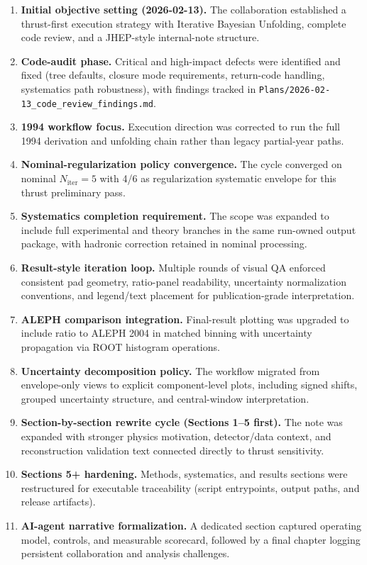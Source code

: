 \begin{enumerate}
\item \textbf{Initial objective setting (2026-02-13).} The collaboration established a thrust-first execution strategy with Iterative Bayesian Unfolding, complete code review, and a JHEP-style internal-note structure.
\item \textbf{Code-audit phase.} Critical and high-impact defects were identified and fixed (tree defaults, closure mode requirements, return-code handling, systematics path robustness), with findings tracked in \texttt{Plans/2026-02-13\_code\_review\_findings.md}.
\item \textbf{1994 workflow focus.} Execution direction was corrected to run the full 1994 derivation and unfolding chain rather than legacy partial-year paths.
\item \textbf{Nominal-regularization policy convergence.} The cycle converged on nominal $N_{\mathrm{iter}}=5$ with 4/6 as regularization systematic envelope for this thrust preliminary pass.
\item \textbf{Systematics completion requirement.} The scope was expanded to include full experimental and theory branches in the same run-owned output package, with hadronic correction retained in nominal processing.
\item \textbf{Result-style iteration loop.} Multiple rounds of visual QA enforced consistent pad geometry, ratio-panel readability, uncertainty normalization conventions, and legend/text placement for publication-grade interpretation.
\item \textbf{ALEPH comparison integration.} Final-result plotting was upgraded to include ratio to ALEPH 2004 in matched binning with uncertainty propagation via ROOT histogram operations.
\item \textbf{Uncertainty decomposition policy.} The workflow migrated from envelope-only views to explicit component-level plots, including signed shifts, grouped uncertainty structure, and central-window interpretation.
\item \textbf{Section-by-section rewrite cycle (Sections 1--5 first).} The note was expanded with stronger physics motivation, detector/data context, and reconstruction validation text connected directly to thrust sensitivity.
\item \textbf{Sections 5+ hardening.} Methods, systematics, and results sections were restructured for executable traceability (script entrypoints, output paths, and release artifacts).
\item \textbf{AI-agent narrative formalization.} A dedicated section captured operating model, controls, and measurable scorecard, followed by a final chapter logging persistent collaboration and analysis challenges.

\end{enumerate}
